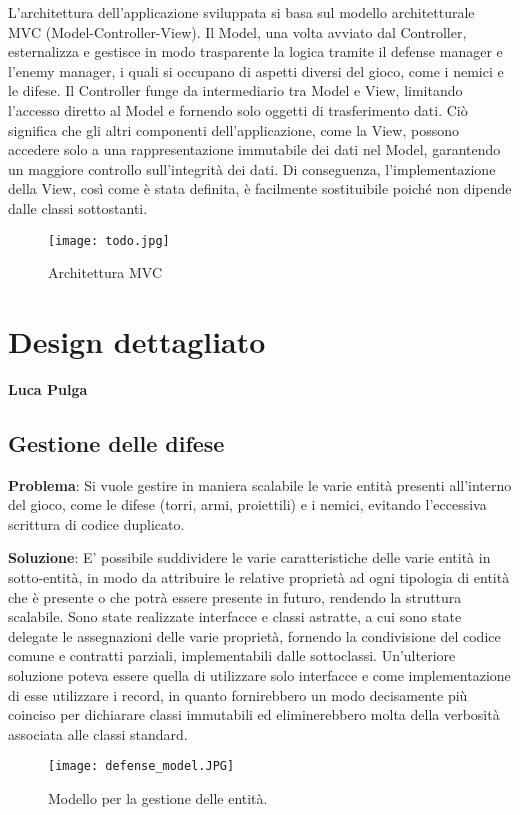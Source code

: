 \documentclass[a4paper,12pt]{report}
\begin{document}
L'architettura dell'applicazione sviluppata si basa sul modello architetturale MVC (Model-Controller-View). Il Model, una volta avviato dal Controller, esternalizza e gestisce in modo trasparente la logica tramite il defense manager e l'enemy manager, i quali si occupano di aspetti diversi del gioco, come i nemici e le difese. Il Controller funge da intermediario tra Model e View, limitando l'accesso diretto al Model e fornendo solo oggetti di trasferimento dati. Ciò significa che gli altri componenti dell'applicazione, come la View, possono accedere solo a una rappresentazione immutabile dei dati nel Model, garantendo un maggiore controllo sull'integrità dei dati. Di conseguenza, l'implementazione della View, così come è stata definita, è facilmente sostituibile poiché non dipende dalle classi sottostanti.
\begin{figure}
    \centering
    \texttt{[image: todo.jpg]}
    \caption{Architettura MVC}
    \label{fig:enter-label}
\end{figure}
\section{Design dettagliato}
\textbf{Luca Pulga}
\subsection{Gestione delle difese}

\textbf{Problema}:
Si vuole gestire in maniera scalabile le varie entità presenti all'interno del gioco, come le difese (torri, armi, proiettili) e i nemici, evitando l'eccessiva scrittura di codice duplicato.

\textbf{Soluzione}:
E' possibile suddividere le varie caratteristiche delle varie entità in sotto-entità, in modo da attribuire le relative proprietà ad ogni tipologia di entità che è presente
o che potrà essere presente in futuro, rendendo la struttura scalabile. Sono state realizzate interfacce e classi astratte, a cui sono state delegate le assegnazioni delle varie proprietà, fornendo la condivisione del codice comune e contratti parziali, implementabili dalle sottoclassi.
Un'ulteriore soluzione poteva essere quella di utilizzare solo interfacce e come implementazione di esse utilizzare i record, in quanto fornirebbero un modo decisamente più coinciso per dichiarare classi immutabili ed eliminerebbero molta della verbosità associata alle classi standard.

\begin{figure}[H]
    \centering
    \texttt{[image: defense\_model.JPG]}
    \caption{Modello per la gestione delle entità.}
    \label{fig:defense-model}
\end{figure}
\end{document}

